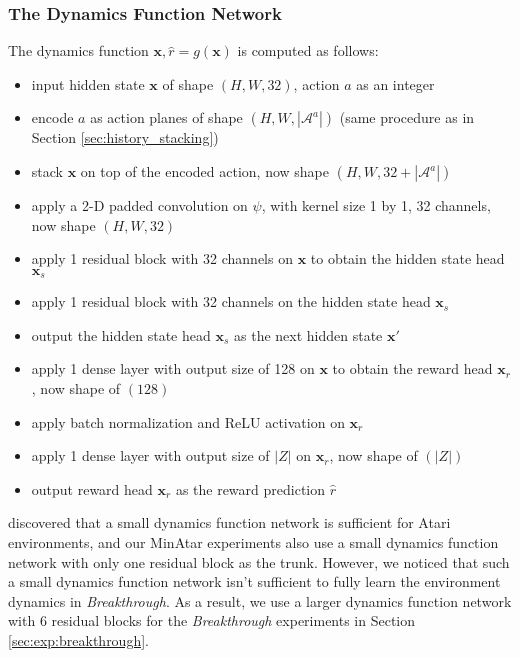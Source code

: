 \subsubsection{The Dynamics Function Network}
The dynamics function $\mathbf{x}, \hat{r} = g(\mathbf{x})$ is computed as follows:
\begin{itemize}
    \item input hidden state $\mathbf{x}$ of shape $(H, W, 32)$, action $a$ as an integer
    \item encode $a$ as action planes of shape $(H, W, |\mathcal{A}^a|)$ (same procedure as in Section \ref{sec:history_stacking})
    \item stack $\mathbf{x}$ on top of the encoded action, now shape $(H, W, 32 + |\mathcal{A}^a|)$

    \item apply a 2-D padded convolution on $\psi$, with kernel size 1 by 1, 32 channels, now shape $(H, W, 32)$
    \item apply 1 residual block with 32 channels on $\mathbf{x}$ to obtain the hidden state head $\mathbf{x}_s$
    \item apply 1 residual block with 32 channels on the hidden state head $\mathbf{x}_s$
    \item output the hidden state head $\mathbf{x}_s$ as the next hidden state $\mathbf{x}'$

    \item apply 1 dense layer with output size of 128 on $\mathbf{x}$ to obtain the reward head $\mathbf{x}_r$, now shape of $(128)$
    \item apply batch normalization and ReLU activation on $\mathbf{x}_r$
    \item apply 1 dense layer with output size of $|Z|$ on $\mathbf{x}_r$, now shape of $(|Z|)$
    \item output reward head $\mathbf{x}_r$ as the reward prediction $\hat{r}$
\end{itemize}
\citeauthor{MasteringAtariGames_Ye.Liu.ea_2021} discovered that a small dynamics function network is sufficient for Atari environments, and our MinAtar experiments also use a small dynamics function network with only one residual block as the trunk.
However, we noticed that such a small dynamics function network isn't sufficient to fully learn the environment dynamics in \textit{Breakthrough}.
As a result, we use a larger dynamics function network with 6 residual blocks for the \textit{Breakthrough} experiments in Section \ref{sec:exp:breakthrough}.

